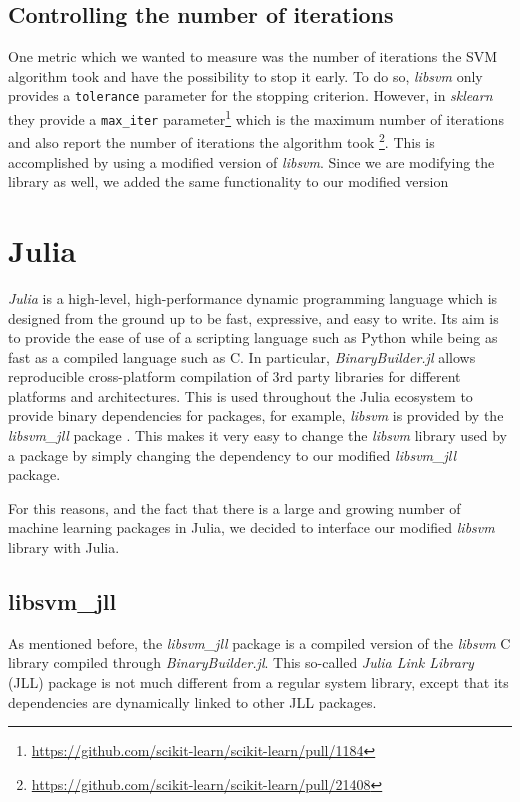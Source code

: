 \subsection{Controlling the number of iterations}

One metric which we wanted to measure was the number of iterations the SVM algorithm took
and have the possibility to stop it early. To do so, \emph{libsvm} only provides a
\texttt{tolerance} parameter for the stopping criterion. However, in \emph{sklearn}
they provide a \texttt{max\_iter} parameter\footnote{\url{https://github.com/scikit-learn/scikit-learn/pull/1184}}
which is the maximum number of iterations
and also report the number of iterations the algorithm took
\footnote{\url{https://github.com/scikit-learn/scikit-learn/pull/21408}}.
This is accomplished by
using a modified version of \emph{libsvm}. Since we are modifying the library as well,
we added the same functionality to our modified version

\section{Julia}%
\label{sub:impl_julia}

\emph{Julia} \cite{bezanson2017julia} is a high-level, high-performance dynamic programming language
which is designed from the ground up to be fast, expressive, and easy to write. Its aim is to provide
the ease of use of a scripting language such as Python while being as fast as a compiled language
such as C. In particular, \emph{BinaryBuilder.jl} \cite{JLLPackagesBinaryBuilder} allows reproducible
cross-platform compilation of 3rd party libraries for different platforms and architectures.
This is used throughout the Julia ecosystem to provide binary dependencies for packages,
for example, \emph{libsvm} is provided by the \emph{libsvm\_jll} package \cite{LibsvmJllJl2022}.
This makes it very easy to change the \emph{libsvm} library used by a package by simply changing
the dependency to our modified \emph{libsvm\_jll} package.

For this reasons, and the fact that there is a large and growing number of machine learning
packages in Julia, we decided to interface our modified \emph{libsvm} library with Julia.

\subsection{libsvm\_jll}

As mentioned before, the \emph{libsvm\_jll} package is a compiled version of the \emph{libsvm} C library
compiled through \emph{BinaryBuilder.jl}. This so-called \emph{Julia Link Library} (JLL) package
is not much different from a regular system library, except that its dependencies are dynamically
linked to other JLL packages.

